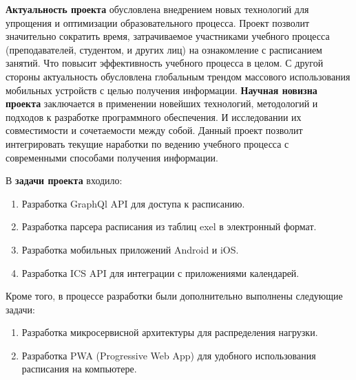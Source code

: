 \textbf{Актуальность проекта} обусловлена внедрением новых технологий для упрощения и оптимизации образовательного процесса. 
Проект позволит значительно сократить время, затрачиваемое участниками учебного процесса (преподавателей, студентом, и других лиц) 
на ознакомление с расписанием занятий. Что повысит эффективность учебного процесса в целом. 
С другой стороны актуальность обусловлена глобальным трендом массового использования мобильных устройств с целью получения информации.
\textbf{Научная новизна проекта} заключается в применении новейших технологий, 
методологий и подходов к разработке программного обеспечения. 
И исследовании их совместимости и сочетаемости между собой. 
Данный проект позволит интегрировать текущие наработки по ведению учебного процесса 
с современными способами получения информации.

В \textbf{задачи проекта} входило:
\begin{enumerate}
    \item Разработка GraphQl API для доступа к расписанию.
    \item Разработка парсера расписания из таблиц exel в электронный формат.
    \item Разработка мобильных приложений Android и iOS.
    \item Разработка ICS API для интеграции с приложениями календарей.
\end{enumerate}
Кроме того, в процессе разработки были дополнительно выполнены следующие задачи:
\begin{enumerate}
    \item Разработка микросервисной архитектуры для распределения нагрузки.
    \item Разработка PWA (Progressive Web App) для удобного использования расписания на компьютере.
\end{enumerate}